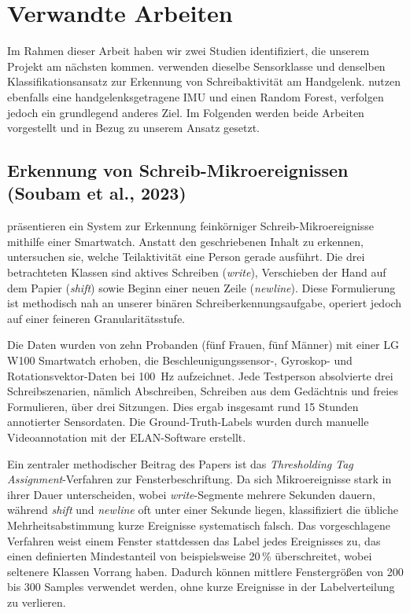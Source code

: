 \section{Verwandte Arbeiten}
\label{sec:related_work}

Im Rahmen dieser Arbeit haben wir zwei Studien identifiziert, die unserem Projekt am nächsten kommen. \citet{soubam2023} verwenden dieselbe Sensorklasse und denselben Klassifikationsansatz zur Erkennung von Schreibaktivität am Handgelenk. \citet{xiamotionhacker2018} nutzen ebenfalls eine handgelenksgetragene IMU und einen Random Forest, verfolgen jedoch ein grundlegend anderes Ziel. Im Folgenden werden beide Arbeiten vorgestellt und in Bezug zu unserem Ansatz gesetzt.

\subsection{Erkennung von Schreib-Mikroereignissen (Soubam et al., 2023)}

\citet{soubam2023} präsentieren ein System zur Erkennung feinkörniger Schreib-Mikroereignisse mithilfe einer Smartwatch. Anstatt den geschriebenen Inhalt zu erkennen, untersuchen sie, welche Teilaktivität eine Person gerade ausführt. Die drei betrachteten Klassen sind aktives Schreiben (\textit{write}), Verschieben der Hand auf dem Papier (\textit{shift}) sowie Beginn einer neuen Zeile (\textit{newline}). Diese Formulierung ist methodisch nah an unserer binären Schreiberkennungsaufgabe, operiert jedoch auf einer feineren Granularitätsstufe.

Die Daten wurden von zehn Probanden (fünf Frauen, fünf Männer) mit einer LG W100 Smartwatch erhoben, die Beschleunigungssensor-, Gyroskop- und Rotationsvektor-Daten bei 100~Hz aufzeichnet. Jede Testperson absolvierte drei Schreibszenarien, nämlich Abschreiben, Schreiben aus dem Gedächtnis und freies Formulieren, über drei Sitzungen. Dies ergab insgesamt rund 15 Stunden annotierter Sensordaten. Die Ground-Truth-Labels wurden durch manuelle Videoannotation mit der ELAN-Software erstellt.

Ein zentraler methodischer Beitrag des Papers ist das \textit{Thresholding Tag Assignment}-Verfahren zur Fensterbeschriftung. Da sich Mikroereignisse stark in ihrer Dauer unterscheiden, wobei \textit{write}-Segmente mehrere Sekunden dauern, während \textit{shift} und \textit{newline} oft unter einer Sekunde liegen, klassifiziert die übliche Mehrheitsabstimmung kurze Ereignisse systematisch falsch. Das vorgeschlagene Verfahren weist einem Fenster stattdessen das Label jedes Ereignisses zu, das einen definierten Mindestanteil von beispielsweise 20\,\% überschreitet, wobei seltenere Klassen Vorrang haben. Dadurch können mittlere Fenstergrößen von 200 bis 300 Samples verwendet werden, ohne kurze Ereignisse in der Labelverteilung zu verlieren.

